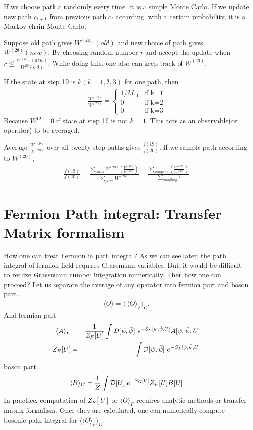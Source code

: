 \documentclass[10pt]{book}
\newcommand{\bea}{\begin{eqnarray}}
\newcommand{\eea}{\end{eqnarray}}
\newcommand{\no}{\nonumber \\}
\def\la{\langle}
\def\ra{\rangle}
\begin{document}
If we choose path $c$ randomly every time, it is a simple Monte Carlo. 
If we update new path $c_{i+1}$ from previous path $c_{i}$ according,
with a certain probability, it is a Markov chain Monte Carlo. 

Suppose old path gives $W^{(20)}(old)$ and new choice of path gives $W^{(20)}(new)$.
By choosing random number $r$ and accept the update when $r \leq \frac{W^{(20)}(new)}{W^{20}(old)}$.
While doing this, one also can keep track of $W^{(19)}$.

If the state at step 19 is $k(k=1,2,3)$ for one path, then
\bea 
\frac{W^{(19)}}{W^{(20)}}=\left\{ \begin{array}{cr} 1/M_{11} & \mbox{if k=1} \\
                                                       0     & \mbox{if k=2} \\ 
                                                       0     & \mbox{if k=3} \end{array} \right.  
\eea 
Because $W^{19}=0$ if state at step 19 is not $k=1$. 
This acts as an observable(or operator) to be averaged.

Average $\frac{W^{(19)}}{W^{(20)}}$ over all twenty-step paths
gives $\frac{f(19)}{f(20)}$. If we sample path according to $ W^{(20)}$, 
\bea 
\frac{f(19)}{f(20)}=\frac{\sum_{paths}  W^{(20)} \left(\frac{W^{(19)}}{W^{(20)}}\right)}{\sum_{paths} W^{(20)}} 
   = \frac{\sum_{sampling} \left(\frac{W^{(19)}}{W^{(20)}}\right)}{\sum_{sampling} 1}  
\eea 

\chapter{Fermion Path integral: Transfer Matrix formalism}
How one can treat Fermion in path integral? As we can see later,
the path integral of fermion field requires Grassmann variables.
But, it would be difficult to realize Grassmann number integration numerically.
Then how one can proceed? Let us separate the average of any operator into
fermion part and boson part.
\bea 
\la O \ra =\la \ \la O\ra_F \ra_G.
\eea 
And fermion part 
\bea 
\la A\ra_F&=&\frac{1}{Z_F[U]}\int {\cal D}[\psi,\bar{\psi}]\ e^{-S_F[\psi,\bar{\psi},U]}
                    A[\psi,\bar{\psi},U] \no 
Z_F[U]&=&\int {\cal D}[\psi,\bar{\psi}]\ e^{-S_F[\psi,\bar{\psi},U]}
\eea 
boson part
\bea 
\la B\ra_G=\frac{1}{Z}\int {\cal D}[U]\ e^{-S_G[U]} Z_F[U] B[U]
\eea 
In practice, computation of $Z_F[U]$ or $\la O\ra _F$ requires analytic methods
or transfer matrix formalism. Once they are calculated, one can numerically 
compute bosonic path integral for $\la \la O\ra_F \ra_G$. 
\end{document}
